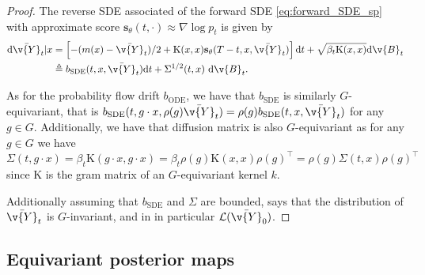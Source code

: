 \begin{proof}
	The reverse SDE associated of the forward SDE \eqref{eq:forward_SDE_sp} with approximate score $\mathbf{s}_\theta(t, \cdot) \approx \nabla \log p_t$ is given by \begin{align}\label{eq:backward_SDE_sp_approx2} \mathrm{d} \bar{\v{Y}}_t|x & = \left[-(m(x) - \bar{\v{Y}}_t)/2 + \mathrm{K}(x,x) \mathbf{s}_\theta(T - t, x, \bar{\v{Y}}_t) \right] \mathrm{d} t + \sqrt{\beta_t \mathrm{K}(x,x)} \mathrm{d} \v{B}_t \\ &\triangleq b_{\text{SDE}}(t, x, \bar{\v{Y}}_t) \mathrm{d} t + \Sigma^{1/2}(t, x) ~\mathrm{d} \v{B}_t.
	\end{align}

	As for the probability flow drift $b_{\text{ODE}}$, we have that $b_{\text{SDE}}$ is similarly $G$-equivariant, that is $b_{\text{SDE}}(t, g\cdot x, \rho(g) \bar{\v{Y}}_t) = \rho(g) b_{\text{SDE}}(t, x, \bar{\v{Y}}_t)$ for any $g \in G$.
	Additionally, we have that diffusion matrix is also $G$-equivariant as for any $g \in G$ we have $\Sigma(t, g \cdot x) = \beta_t \mathrm{K}(g \cdot x, g \cdot x) = \beta_t \rho(g) \mathrm{K}(x, x) \rho(g)^\top = \rho(g) \Sigma(t, x) \rho(g)^\top$ since $\mathrm{K}$ is the gram matrix of an $G$-equivariant kernel $k$.

	Additionally assuming that $b_{\text{SDE}}$ and $\Sigma$ are bounded, \textcite[Proposition 3.6,][]{yim2023se} says that the distribution of $\bar{\v{Y}}_t$ is $G$-invariant, and in in particular $\mathcal{L}(\bar{\v{Y}}_0)$.

\end{proof}

\subsection{Equivariant posterior maps}
\label{sec:equiv_posterior}
\label{sec:proof_equiv_posterior}

\def\phiA{\phi_{*, \c{A}}}
\def\iso{\operatorname{Isom}}

